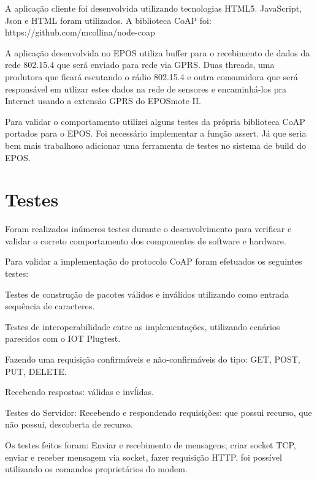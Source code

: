 A aplica\c{c}\~ao cliente foi desenvolvida utilizando tecnologias HTML5. JavaScript, Json e HTML foram utilizados.
A biblioteca CoAP foi:\\https://github.com/mcollina/node-coap

A aplica\c{c}\~ao desenvolvida no EPOS utiliza buffer para o recebimento de dados da rede 802.15.4 que ser\'a enviado para rede via GPRS. Duas threads, uma produtora que ficar\'a escutando o r\'adio 802.15.4 e outra consumidora que ser\'a respons\'avel em utlizar estes dados na rede de sensores e encaminh\'a-los pra Internet usando a extens\~ao GPRS do EPOSmote II.

Para validar o comportamento utilizei alguns testes da pr\'opria biblioteca CoAP portados para o EPOS. Foi necess\'ario implementar a fun\c{c}\~ao assert. J\'a que seria bem mais trabalhoso adicionar uma ferramenta de testes no sistema de build do EPOS.

\section{Testes}

Foram realizados in\'umeros testes durante o desenvolvimento para verificar e validar o correto comportamento dos componentes de software e hardware.

Para validar a implementa\c{c}\~ao do protocolo CoAP foram efetuados os seguintes testes:

Testes de constru\c{c}\~ao de pacotes v\'alidos e inv\'alidos utilizando como entrada sequ\^encia de caracteres.

Testes de interoperabilidade entre as implementa\c{c}\~oes, utilizando cen\'arios parecidos com o IOT Plugtest.

Fazendo uma requisi\c{c}\~ao confirm\'aveis e n\~ao-confirm\'aveis do tipo: GET, POST, PUT, DELETE.

Recebendo respostas: v\'alidas e inv\'lidas.

Testes do Servidor:
Recebendo e respondendo requisi\c{c}\~oes: que possui recurso, que n\~ao possui, descoberta de recurso.

Os testes feitos foram: Enviar e recebimento de mensagens; criar socket TCP, enviar e receber mensagem via socket, fazer requisi\c{c}\~ao HTTP, foi poss\'ivel utilizando os comandos propriet\'arios do modem.

